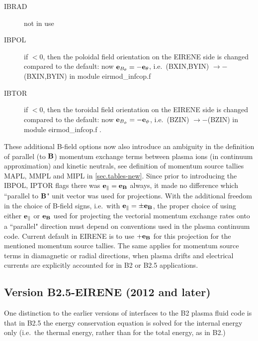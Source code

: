 \begin{description}
  \item[IBRAD] not in use
  \item[IBPOL] if $< 0$, then the poloidal field
        orientation on the EIRENE side is changed compared to the default: now
        $\mathbf{e}_{B_\theta} = -\mathbf{e}_\theta$, i.e.\ (BXIN,BYIN) $\rightarrow - $(BXIN,BYIN) in
        module eirmod\_infcop.f
  \item[IBTOR] if $< 0$, then the toroidal field
        orientation on the EIRENE side is changed compared to the default: now
        $\mathbf{e}_{B_\phi} = -\mathbf{e}_\phi$, i.e.\ (BZIN) $\rightarrow - $(BZIN) in module
        eirmod\_infcop.f .
\end{description}

These additional B-field options now also introduce an ambiguity in the
definition of parallel (to $\mathbf{B}$) momentum exchange terms between plasma ions
(in continuum approximation) and kinetic neutrals, see definition of momentum
source tallies MAPL, MMPL and MIPL in \cref{sec.tables-new}.
Since prior to introducing the IBPOL, IPTOR flags there was  $\mathbf{e}_\| =
  \mathbf{e}_{\mathbf{B}}$ always, it made no difference which ``parallel to $\mathbf{B}$" unit vector
was used for projections.
With the additional freedom in the choice of B-field signs, i.e.\ with $\mathbf{e}_\|
  = \pm \mathbf{e}_{\mathbf{B}}$, the proper choice of using either $\mathbf{e}_\|$ or $\mathbf{e}_{\mathbf{B}}$
used for projecting the vectorial momentum exchange rates onto a ``parallel"
direction must depend on conventions used in the plasma continuum code.
Current default in EIRENE is to use $+\mathbf{e}_{\mathbf{B}}$ for this projection for the
mentioned momentum source tallies.
The same applies for momentum source terms in diamagnetic or radial directions,
when plasma drifts and electrical currents are explicitly accounted for in B2
or B2.5 applications.

\subsection{Version B2.5-EIRENE (2012 and later)} \label{sec2.14.4}

One distinction to the earlier versions of interfaces to the B2 plasma fluid
code is that in B2.5 the energy conservation equation is solved for the
internal energy only (i.e.\ the thermal energy, rather than for the total
energy, as in B2.)


